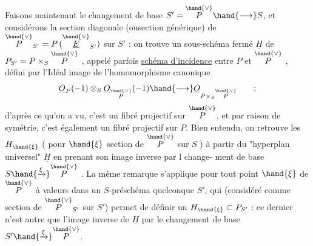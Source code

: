 
Faisons maintenant le changement de base $S'=\overset{\hand{\vee}}{P}\hand{\longrightarrow} S$, et considérons
la section diagonale (ousection générique) de $\overset{\hand{\vee}}{P}_{S'} = P\,(\overset{\hand{\vee}}{\underline{E}}_{S'})$ sur $S'$ :
on trouve un sous-schéma fermé $\underline{H}$ de $P_{S'} = P\times_S\overset{\hand{\vee}}{P}$ , appelé parfois
\uline{schéma d'incidence} entre $P$ et $\overset{\hand{\vee}}{P}$ , défini par l'Idéal image de
l'homomorphisme canonique
\[ \underline{O}_P(-1)\otimes_S\underline{O}_{\overset{\hand{\vee}}{P}}(-1)\hand{\longrightarrow} \underline{O}_{P\times_S\overset{\hand{\vee}}{P}} \qquad ; \]
d'après ce qu'on a vu, c'est un fibré projectif sur $\overset{\hand{\vee}}{P}$, et par raison de
symétrie, c'est également un fibré projectif sur $P$. Bien entendu, on
retrouve les $H_{\hand{\xi}}$ ( pour $\hand{\xi}$ section de $\overset{\hand{\vee}}{P}$ sur $S$ )\hand{,} à partir
du "hyperplan universel" $\underline{H}$\hand{,} en prenant son image inverse par l change-%
ment de base $S\hand{\xrightarrow{\xi}}\overset{\hand{\vee}}{P}$ . La même remarque s'applique pour tout point
$\hand{\xi}$ de $\overset{\hand{\vee}}{P}$ à valeurs dans un $S$-préschéma quelconque $S'$, qui (considéré comme
section de $\overset{\hand{\vee}}{P}_{S'}$ sur $S'$) permet de définir un $H_{\hand{\xi}}\subset P_{S'}$ : ce dernier n'est
autre que l'image inverse de $\underline{H}$ par le changement de base $S'\hand{\xrightarrow{\xi}}\overset{\hand{\vee}}{P}$.

